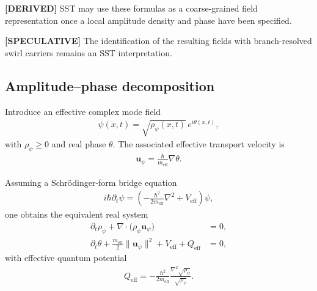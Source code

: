 \documentclass[11pt]{article}
\theoremstyle{definition}
\theoremstyle{plain}
\theoremstyle{remark}
\begin{document}
        \textbf{[DERIVED]} SST may use these formulas as a coarse-grained field representation once a local amplitude density and phase have been specified.
        
        \textbf{[SPECULATIVE]} The identification of the resulting fields with branch-resolved swirl carriers remains an SST interpretation.
    
    \subsection{Amplitude--phase decomposition}
        Introduce an effective complex mode field
        \begin{align}
            \psi(x,t) = \sqrt{\rho_\psi(x,t)}\,e^{i\theta(x,t)},
            \label{eq:madelung_ansatz_appendix}
        \end{align}
        with \(\rho_\psi \ge 0\) and real phase \(\theta\). The associated effective transport velocity is
        \begin{align}
            \mathbf{u}_\psi
            =
            \frac{\hbar}{m_{\mathrm{eff}}}\nabla\theta.
            \label{eq:effective_phase_velocity}
        \end{align}
        
        Assuming a Schr\"odinger-form bridge equation
        \begin{align}
            i\hbar \partial_t \psi
            =
            \left(
                -\frac{\hbar^2}{2m_{\mathrm{eff}}}\nabla^2 + V_{\mathrm{eff}}
            \right)\psi,
            \label{eq:schrodinger_bridge_appendix}
        \end{align}
        one obtains the equivalent real system
        \begin{align}
            \partial_t \rho_\psi + \nabla\cdot\bigl(\rho_\psi \mathbf{u}_\psi\bigr) &= 0,
            \label{eq:continuity_bridge_appendix}\\
            \partial_t \theta
            +
            \frac{m_{\mathrm{eff}}}{2}\lVert \mathbf{u}_\psi\rVert^2
            + V_{\mathrm{eff}}
            + Q_{\mathrm{eff}} &= 0,
            \label{eq:hamjac_bridge_appendix}
        \end{align}
        with effective quantum potential
        \begin{align}
            Q_{\mathrm{eff}}
            =
            -\frac{\hbar^2}{2m_{\mathrm{eff}}}
            \frac{\nabla^2 \sqrt{\rho_\psi}}{\sqrt{\rho_\psi}}.
            \label{eq:quantum_potential_appendix}
        \end{align}
        
\end{document}
